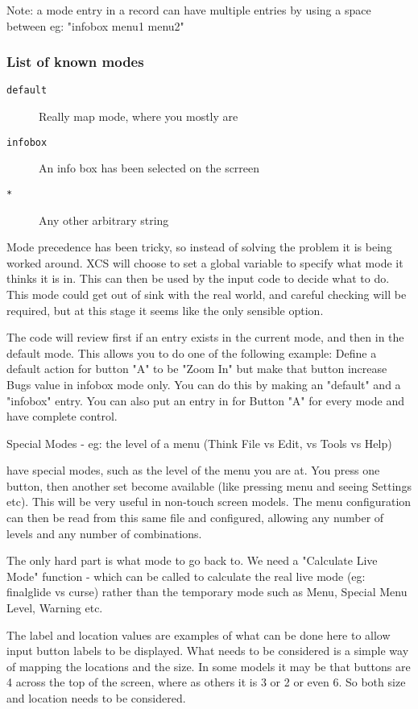 Note: a mode entry in a record can have multiple entries by using a space
between eg: "infobox menu1 menu2"

\subsubsection{List of known modes}

\begin{description}
\item[\texttt{default}] Really map mode, where you mostly are
\item[\texttt{infobox}] An info box has been selected on the scrreen
\item[\texttt{*}] Any other arbitrary string
\end{description}

Mode precedence has been tricky, so instead of solving the problem 
it is being worked around. XCS will choose to set a global variable 
to specify what mode it thinks it is in. This can then be used by the
input code to decide what to do. This mode could get out of sink
with the real world, and careful checking will be required, but at
this stage it seems like the only sensible option.

The code will review first if an entry exists in the current mode, and 
then in the default mode. This allows you to do one of the following
example: Define a default action for button "A" to be "Zoom In" but
make that button increase Bugs value in infobox mode only. You can do
this by making an "default" and a "infobox" entry. You can also put an entry
in for Button "A" for every mode and have complete control.

Special Modes - eg: the level of a menu (Think File vs Edit, vs Tools vs Help)

have special modes, such as
the level of the menu you are at. You press one button, then another
set become available (like pressing menu and seeing Settings etc). This
will be very useful in non-touch screen models. The menu configuration
can then be read from this same file and configured, allowing any
number of levels and any number of combinations.

The only hard part is what mode to go back to. We need a 
"Calculate Live Mode" function - which can be called to calculate the
real live mode (eg: finalglide vs curse) rather than the temporary
mode such as Menu, Special Menu Level, Warning etc.

The label and location values are examples of what can be done here
to allow input button labels to be displayed. What needs to be 
considered is a simple way of mapping the locations and the size.
In some models it may be that buttons are 4 across the top of the
screen, where as others it is 3 or 2 or even 6. So both size and
location needs to be considered.


